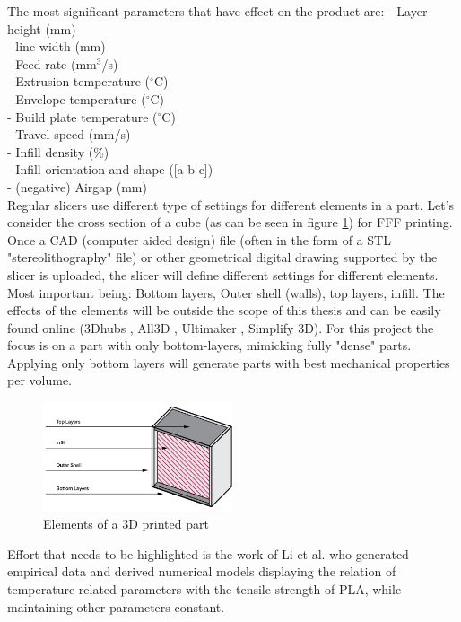 The most significant parameters that have effect on the product are:
- Layer height (mm)\\
- line width (mm)\\
- Feed rate (mm$^3$/s)\\
- Extrusion temperature ($^{\circ}$C)\\
- Envelope temperature ($^{\circ}$C)\\
- Build plate temperature ($^{\circ}$C)\\
- Travel speed (mm/s)\\
- Infill density (\%)\\
- Infill orientation and shape ([a b c])\\
- (negative) Airgap (mm)\\


Regular slicers use different type of settings for  different elements in a part. Let's consider the cross section of a cube (as can be seen in figure \ref{fig:Shell}) for FFF printing. Once a CAD (computer aided design) file (often in the form of a STL "stereolithography" file) or other geometrical digital drawing supported by the slicer is uploaded, the slicer will define different settings for different elements. Most important being: Bottom layers, Outer shell (walls), top layers, infill. The effects of the  elements will be outside the scope of this thesis and can be easily found online (3Dhubs \cite{3Dhubs3DHubs}, All3D \cite{all3dpAll3dp}, Ultimaker \cite{UltimakerUltimakerSheet}, Simplify 3D\cite{Simplefy3DPrintGuide}). For this project the focus is on a part with only bottom-layers, mimicking fully "dense" parts. Applying only bottom layers will generate parts with best mechanical properties per volume.   \cite{Li2017TheProperties}

\begin{figure}[H]
    \centering
    \includegraphics[width=0.5\textwidth]{chapter_2/figures/Shell.PNG}
    \caption{Elements of a 3D printed part \cite{3DHubsIntroductionPrinting}}
    \label{fig:Shell}
\end{figure}
Effort that needs to be highlighted is the work of  Li et al. \cite{Li2017TheProperties} who generated empirical data and derived numerical models displaying the relation of temperature related parameters with the tensile strength of PLA, while maintaining other parameters constant.

